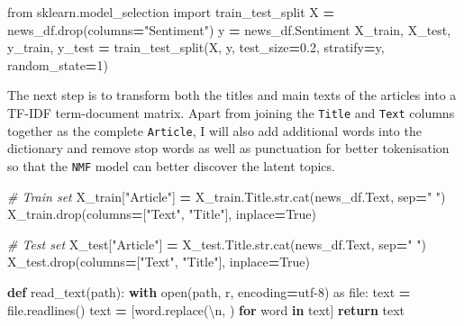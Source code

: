 \documentclass[a4paper, oneside]{report}
\newenvironment{Shaded}{\begin{snugshade}}{\end{snugshade}}
\newcommand{\BuiltInTok}[1]{#1}
\newcommand{\CharTok}[1]{\textcolor[rgb]{0.31,0.60,0.02}{#1}}
\newcommand{\CommentTok}[1]{\textcolor[rgb]{0.56,0.35,0.01}{\textit{#1}}}
\newcommand{\ControlFlowTok}[1]{\textcolor[rgb]{0.13,0.29,0.53}{\textbf{#1}}}
\newcommand{\DecValTok}[1]{\textcolor[rgb]{0.00,0.00,0.81}{#1}}
\newcommand{\FloatTok}[1]{\textcolor[rgb]{0.00,0.00,0.81}{#1}}
\newcommand{\ImportTok}[1]{#1}
\newcommand{\KeywordTok}[1]{\textcolor[rgb]{0.13,0.29,0.53}{\textbf{#1}}}
\newcommand{\NormalTok}[1]{#1}
\newcommand{\OperatorTok}[1]{\textcolor[rgb]{0.81,0.36,0.00}{\textbf{#1}}}
\newcommand{\StringTok}[1]{\textcolor[rgb]{0.31,0.60,0.02}{#1}}
\newcommand{\VariableTok}[1]{\textcolor[rgb]{0.00,0.00,0.00}{#1}}
\renewenvironment{Shaded}
{
  \vspace{4pt}%
  \begin{snugshade}%
}{%
  \end{snugshade}%
  \vspace{4pt}%
}
\begin{document}
\begin{Shaded}
\begin{Highlighting}[]
\ImportTok{from}\NormalTok{ sklearn.model\_selection }\ImportTok{import}\NormalTok{ train\_test\_split}
\NormalTok{X }\OperatorTok{=}\NormalTok{ news\_df.drop(columns}\OperatorTok{=}\StringTok{"Sentiment"}\NormalTok{)}
\NormalTok{y }\OperatorTok{=}\NormalTok{ news\_df.Sentiment}
\NormalTok{X\_train, X\_test, y\_train, y\_test }\OperatorTok{=}\NormalTok{ train\_test\_split(X, y, test\_size}\OperatorTok{=}\FloatTok{0.2}\NormalTok{, stratify}\OperatorTok{=}\NormalTok{y, random\_state}\OperatorTok{=}\DecValTok{1}\NormalTok{)}
\end{Highlighting}
\end{Shaded}

The next step is to transform both the titles and main texts of the
articles into a TF-IDF term-document matrix. Apart from joining the
\texttt{Title} and \texttt{Text} columns together as the complete
\texttt{Article}, I will also add additional words into the dictionary
and remove stop words as well as punctuation for better tokenisation so
that the \texttt{NMF} model can better discover the latent topics.

\begin{Shaded}
\begin{Highlighting}[]
\CommentTok{\# Train set}
\NormalTok{X\_train[}\StringTok{"Article"}\NormalTok{] }\OperatorTok{=}\NormalTok{ X\_train.Title.}\BuiltInTok{str}\NormalTok{.cat(news\_df.Text, sep}\OperatorTok{=}\StringTok{" "}\NormalTok{)}
\NormalTok{X\_train.drop(columns}\OperatorTok{=}\NormalTok{[}\StringTok{"Text"}\NormalTok{, }\StringTok{"Title"}\NormalTok{], inplace}\OperatorTok{=}\VariableTok{True}\NormalTok{)}

\CommentTok{\# Test set}
\NormalTok{X\_test[}\StringTok{"Article"}\NormalTok{] }\OperatorTok{=}\NormalTok{ X\_test.Title.}\BuiltInTok{str}\NormalTok{.cat(news\_df.Text, sep}\OperatorTok{=}\StringTok{" "}\NormalTok{)}
\NormalTok{X\_test.drop(columns}\OperatorTok{=}\NormalTok{[}\StringTok{"Text"}\NormalTok{, }\StringTok{"Title"}\NormalTok{], inplace}\OperatorTok{=}\VariableTok{True}\NormalTok{)}
\end{Highlighting}
\end{Shaded}

\begin{Shaded}
\begin{Highlighting}[]
\KeywordTok{def}\NormalTok{ read\_text(path):}
    \ControlFlowTok{with} \BuiltInTok{open}\NormalTok{(path, }\StringTok{\textquotesingle{}r\textquotesingle{}}\NormalTok{, encoding}\OperatorTok{=}\StringTok{\textquotesingle{}utf{-}8\textquotesingle{}}\NormalTok{) }\ImportTok{as} \BuiltInTok{file}\NormalTok{:}
\NormalTok{        text }\OperatorTok{=} \BuiltInTok{file}\NormalTok{.readlines()}
\NormalTok{        text }\OperatorTok{=}\NormalTok{ [word.replace(}\StringTok{\textquotesingle{}}\CharTok{\textbackslash{}n}\StringTok{\textquotesingle{}}\NormalTok{, }\StringTok{\textquotesingle{}\textquotesingle{}}\NormalTok{) }\ControlFlowTok{for}\NormalTok{ word }\KeywordTok{in}\NormalTok{ text]}
        \ControlFlowTok{return}\NormalTok{ text}
\end{Highlighting}
\end{Shaded}
\end{document}
